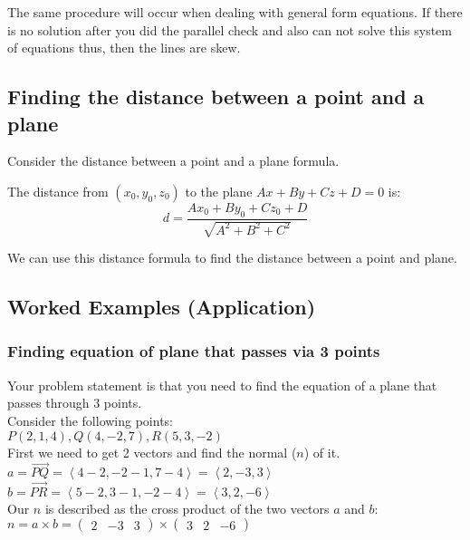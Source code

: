 The same procedure will occur when dealing with general form equations. If there is no solution after you did the parallel check and also can not solve this system of equations thus, then the lines are skew.

\subsection{Finding the distance between a point and a plane}
Consider the distance between a point and a plane formula.

The distance from $(x_0,y_0,z_0)$ to the plane $Ax+By+Cz+D=0$ is: \\
\begin{equation}
    d = \frac{Ax_0+By_0+Cz_0+D}{\sqrt{A^2+B^2+C^2}}
\end{equation}

We can use this distance formula to find the distance between a point and plane.

\subsection{Worked Examples (Application)}
\subsubsection{Finding equation of plane that passes via 3 points}
Your problem statement is that you need to find the equation of a plane that passes through 3 points. \\ 

Consider the following points: \\

$P(2,1,4),Q(4,-2,7),R(5,3,-2)$ \\

First we need to get 2 vectors and find the normal ($n$) of it. \\ 

$a = \vec{PQ} = \left\langle 4-2,-2-1,7-4\right\rangle  = \left\langle 2,-3,3\right\rangle $ \\

$b = \vec{PR} = \left\langle 5-2,3-1,-2-4\right\rangle = \left\langle 3,2,-6\right\rangle $ \\

Our $n$ is described as the cross product of the two vectors $a$ and $b$: \\

$n = a\times b = \begin{pmatrix}2&-3&3\end{pmatrix}\times \begin{pmatrix}3&2&-6\end{pmatrix}$  \\

